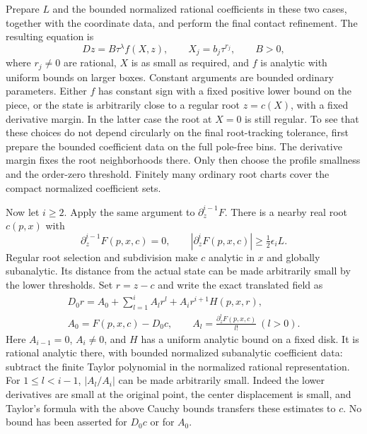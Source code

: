 Prepare $L$ and the bounded normalized rational coefficients in these
two cases, together with the coordinate data, and perform the final
contact refinement.  The resulting equation is
\begin{equation}
\label{eq:subdivision-terminal-box}
 Dz=B\tau^\lambda f(X,z),\qquad
 X_j=b_j\tau^{r_j},\qquad B>0,
\end{equation}
where $r_j\ne0$ are rational, $X$ is as small as required, and $f$ is
analytic with uniform bounds on larger boxes.  Constant arguments are
bounded ordinary parameters.  Either $f$ has constant sign with a fixed
positive lower bound on the piece, or the state is arbitrarily close to
a regular root $z=c(X)$, with a fixed derivative margin.  In the latter
case the root at $X=0$ is still regular.  To see that these choices do
not depend circularly on the final root-tracking tolerance, first prepare
the bounded coefficient data on the full pole-free bins.  The derivative
margin fixes the root neighborhoods there.  Only then choose the profile
smallness and the order-zero threshold.  Finitely many ordinary root
charts cover the compact normalized coefficient sets.

Now let $i\ge2$.  Apply the same argument to $\partial_z^{i-1}F$.
There is a nearby real root $c(p,x)$ with
\[
 \partial_z^{i-1}F(p,x,c)=0,\qquad
 |\partial_z^iF(p,x,c)|\ge\tfrac12\epsilon_iL.
\]
Regular root selection and subdivision make $c$ analytic in $x$ and
globally subanalytic.  Its distance from the actual state can be made
arbitrarily small by the lower thresholds.  Set $r=z-c$ and write the
exact translated field as
\begin{equation}
\label{eq:subdivision-center}
\begin{gathered}
 D_0r=A_0+\sum_{l=1}^{i}A_lr^l+A_ir^{i+1}H(p,x,r),
 \\
 A_0=F(p,x,c)-D_0c,\qquad
 A_l=\frac{\partial_z^lF(p,x,c)}{l!}\ (l>0).
\end{gathered}
\end{equation}
Here $A_{i-1}=0$, $A_i\ne0$, and $H$ has a uniform analytic bound
on a fixed disk.  It is rational analytic there, with bounded normalized
subanalytic coefficient data: subtract the finite Taylor polynomial in
the normalized rational representation.  For $1\le l<i-1$,
$|A_l/A_i|$ can be made arbitrarily small.  Indeed the lower derivatives
are small at the original point, the center displacement is small, and
Taylor's formula with the above Cauchy bounds transfers these estimates
to $c$.  No bound has been asserted for $D_0c$ or for $A_0$.

